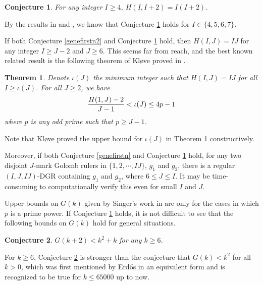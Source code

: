 \documentclass[preprint,12pt]{elsarticle}
\newtheorem{thm}{Theorem}
\newtheorem{conj}{Conjecture}
\begin{document}
\vspace{0.3cm}
\begin{conj} \label{HII2regular}
For any integer $I \geq 4$, $H(I, I+2) = I(I+2)$.
\end{conj}
\vspace{0.3cm}

By the results in \cite{Klove} and \cite{Shearer}, we know that Conjecture \ref{HII2regular} holds for $I \in \{4,5,6,7\}$.

If both Conjecture \ref{genefirstn2} and Conjecture \ref{HII2regular} hold, then $H(I, J) = IJ$ for any integer $I \geq J-2$ and $J \geq 6$.
This seems far from reach, and the best known related result is the following theorem of Kl{\o}ve proved in \cite{Klove}.


\vspace{0.3cm}
\begin{thm} \label{Klovetheorem}\cite{Klove}
Denote $\iota(J)$ the minimum integer such that $H(I, J) = IJ$ for all $I \ge \iota(J)$.
For all $J \ge 2$, we have
$${{H(1,J)-2} \over {J-1}} < \iota(J) \le 4p-1$$
where $p$ is any odd prime such that $p \ge J-1$.
\end{thm}
\vspace{0.3cm}

Note that Kl{\o}ve proved the upper bound for $\iota(J)$ in Theorem \ref{Klovetheorem} constructively.


Moreover, if both Conjecture \ref{genefirstn} and Conjecture \ref{HII2regular} hold, for any two disjoint $J$-mark Golomb rulers 
in $\{1, 2,  \cdots, IJ\}$, $g_1$ and $g_2$, there is a regular $(I,J,IJ)$-DGR containing $g_1$ and $g_2$,
where $6 \leq J \leq I$.
It may be time-consuming to computationally verify this even for small $I$ and $J$.

Upper bounds on $G(k)$
given by Singer's work in \cite{singer1938theorem}
are only for the cases in which $p$ is a prime power.
If Conjecture \ref{HII2regular} holds, it is not difficult to see that the following bounds on $G(k)$ hold for general situations.

\vspace{0.3cm}
\begin{conj} \label{SRkk+2b}
$G(k+2) < k^2 + k$ for any $k \geq 6$.
\end{conj}
\vspace{0.3cm}

For $k \ge 6$, Conjecture \ref{SRkk+2b} is stronger than the conjecture that $G(k) < k^2$ for all $k > 0$,
which was first mentioned by Erd\H{o}s in an equivalent form\cite{ET1941} and is recognized to be true for $k \leq 65000$ up to now\cite{dimitromanolakis2002analysis}.
\end{document}
